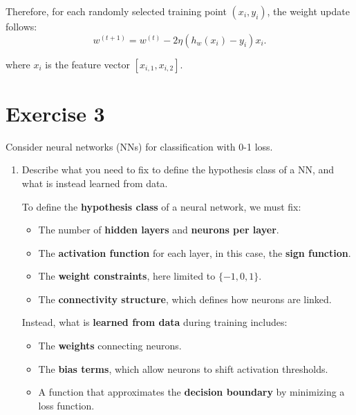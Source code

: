 \documentclass[a4paper,11pt,oneside]{book}
\begin{document}
\begin{enumerate}
\begin{solution}
                    Therefore, for each randomly selected training point $(x_i, y_i)$, the weight update follows:
                    \[
                    w^{(t+1)} = w^{(t)} - 2\eta (h_w(x_i) - y_i) x_i.
                    \]
                    
                    where $x_i$ is the feature vector $[x_{i,1}, x_{i,2}]$.
                \end{solution}  
    \end{enumerate}


\clearpage
\section{Exercise 3}
    Consider neural networks (NNs) for classification with 0-1 loss.
    \begin{enumerate}
        \item Describe what you need to fix to define the hypothesis class of a NN, and what is instead learned from data.
        
            \begin{solution}
                To define the \textbf{hypothesis class} of a neural network, we must fix:
                \begin{itemize}
                    \item The number of \textbf{hidden layers} and \textbf{neurons per layer}.
                    \item The \textbf{activation function} for each layer, in this case, the \textbf{sign function}.
                    \item The \textbf{weight constraints}, here limited to $\{-1, 0, 1\}$.
                    \item The \textbf{connectivity structure}, which defines how neurons are linked.
                \end{itemize}
                
                Instead, what is \textbf{learned from data} during training includes:
                \begin{itemize}
                    \item The \textbf{weights} connecting neurons.
                    \item The \textbf{bias terms}, which allow neurons to shift activation thresholds.
                    \item A function that approximates the \textbf{decision boundary} by minimizing a loss function.
                \end{itemize}
                

\end{solution}
\end{enumerate}
\end{document}
